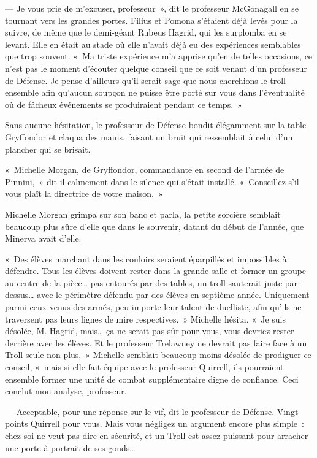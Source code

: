 --- Je vous prie de m'excuser, professeur~», dit le professeur McGonagall en se tournant vers les grandes portes.
Filius et Pomona s'étaient déjà levés pour la suivre, de même que le demi-géant Rubeus Hagrid, qui les surplomba en se levant.
Elle en était au stade où elle n'avait déjà eu des expériences semblables que trop souvent.
«~Ma triste expérience m'a apprise qu'en de telles occasions, ce n'est pas le moment d'écouter quelque conseil que ce soit venant d'un professeur de Défense.
Je pense d'ailleurs qu'il serait sage que nous cherchions le troll ensemble afin qu'aucun soupçon ne puisse être porté sur vous dans l'éventualité où de fâcheux événements se produiraient pendant ce temps.~»

Sans aucune hésitation, le professeur de Défense bondit élégamment sur la table Gryffondor et claqua des mains, faisant un bruit qui ressemblait à celui d'un plancher qui se brisait.

«~Michelle Morgan, de Gryffondor, commandante en second de l'armée de Pinnini,~» dit-il calmement dans le silence qui s'était installé.
«~Conseillez s'il vous plaît la directrice de votre maison.~»

Michelle Morgan grimpa sur son banc et parla, la petite sorcière semblait beaucoup plus sûre d'elle que dans le souvenir, datant du début de l'année, que Minerva avait d'elle.

«~Des élèves marchant dans les couloirs seraient éparpillés et impossibles à défendre.
Tous les élèves doivent rester dans la grande salle et former un groupe au centre de la pièce… pas entourés par des tables, un troll sauterait juste par-dessus… avec le périmètre défendu par des élèves en septième année.
Uniquement parmi ceux venus des armés, peu importe leur talent de duelliste, afin qu'ils ne traversent pas leurs lignes de mire respectives.~»
Michelle hésita.
«~Je suis désolée, M. Hagrid, mais… ça ne serait pas sûr pour vous, vous devriez rester derrière avec les élèves.
Et le professeur Trelawney ne devrait pas faire face à un Troll seule non plus,~» Michelle semblait beaucoup moins désolée de prodiguer ce conseil, «~mais si elle fait équipe avec le professeur Quirrell, ils pourraient ensemble former une unité de combat supplémentaire digne de confiance.
Ceci conclut mon analyse, professeur.

--- Acceptable, pour une réponse sur le vif, dit le professeur de Défense.
Vingt points Quirrell pour vous.
Mais vous négligez un argument encore plus simple~: chez soi ne veut pas dire en sécurité, et un Troll est assez puissant pour arracher une porte à portrait de ses gonds…

